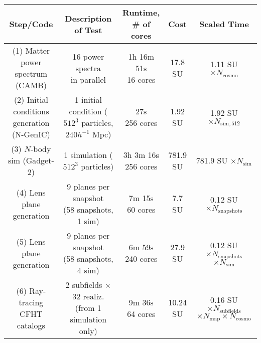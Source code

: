 \documentclass[10pt, preprint]{aastex}
\begin{document}
\begin{table}[t!] 
\begin{center}
\begin{tabular}{|c|c|c|c|c|}
\hline
\textbf{Step/Code} & \textbf{Description of Test} & \pbox{20cm}{\textbf{Runtime,}\\ \textbf{\# of cores}} & \textbf{Cost} & \textbf{Scaled Time} \\ \hline \hline \hline\hline
\pbox{20cm}{(1) Matter power \\ spectrum (CAMB)} & \pbox{20cm}{16 power spectra \\ in parallel} & \pbox{20cm}{1h 16m 51s\\16 cores} & 17.8 SU & 1.11 SU $\times N_{\mathrm{cosmo}}$ \\ \hline 
\pbox{20cm}{(2) Initial conditions\\ generation (N-GenIC)\\} & \pbox{20cm}{1 initial condition \\ ($512^3$ particles,\\ $240 h^{-1}$ Mpc)} & \pbox{20cm}{27s\\256 cores} & 1.92 SU & 1.92 SU $\times N_{\mathrm{sim,512}}$ \\ \hline
\pbox{20cm}{(3) $N$-body sim\\ (Gadget-2)} & \pbox{20cm}{1 simulation \\ ($512^3$ particles)} & \pbox{20cm}{3h 3m 16s\\256 cores} & 781.9 SU & 781.9 SU $\times N_{\mathrm{sim}}$ \\ \hline \hline \hline \hline
\pbox{20cm}{(4) Lens plane\\ generation} & \pbox{20cm}{9 planes per snapshot\\ (58 snapshots, 1 sim)} & \pbox{20cm}{7m 15s\\60 cores} & 7.7 SU & 0.12 SU$\times N_{\mathrm{snapshots}}$ \\ \hline
\pbox{20cm}{(5) Lens plane\\ generation} & \pbox{20cm}{9 planes per snapshot\\ (58 snapshots, 4 sim)} & \pbox{20cm}{6m 59s\\240 cores} & 27.9 SU & \pbox{20cm}{0.12 SU$\times N_{\mathrm{snapshots}}$ \\ $\times N_{\mathrm{sim}}$} \\ \hline \hline
\pbox{20cm}{(6) Ray-tracing \\ CFHT catalogs} & \pbox{20cm}{2 subfields $\times$ 32 realiz. \\ (from 1 simulation only)} & \pbox{20cm}{9m 36s\\64 cores} & 10.24 SU & \pbox{20cm}{0.16 SU $\times N_{\mathrm{subfields}}$\\ $\times N_{\mathrm{map}}\times N_{\mathrm{cosmo}}$} \\ \hline

\end{tabular}
\end{center}
\end{table}
\end{document}
